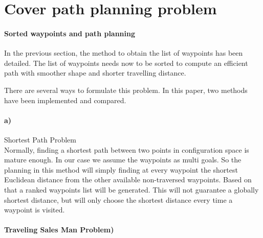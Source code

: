 \chapter{Cover path planning problem } 


\minitoc




   \subsubsection{Sorted waypoints and path planning} \label{sorted_}
In the previous section, the method to obtain the list of waypoints has been detailed. The list of waypoints needs now to be sorted to compute an efficient path with smoother shape and shorter travelling distance. 


There are several ways to formulate this problem. In this paper, two methods have been implemented and compared.
\subsubsection*{a)}{Shortest Path Problem}
\\Normally, finding a shortest path between two points in configuration space is mature enough. In our case we assume the waypoints as multi goals. So the planning in this method will simply finding at every waypoint the shortest Euclidean distance from the other available non-traversed waypoints. Based on that a ranked waypoints list will be generated. This will not guarantee a globally shortest distance, but will only choose the shortest distance every time a waypoint is visited.


\subsubsection*{Traveling Sales Man Problem)}


